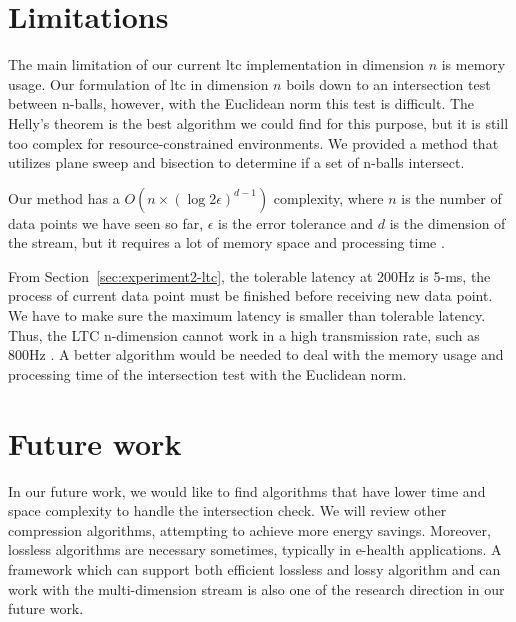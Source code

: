 \section{Limitations}


The main limitation of our current \acrshort{ltc} implementation in
dimension $n$ is memory usage. Our formulation of \acrshort{ltc} in
dimension $n$ boils down to an intersection test between n-balls, however,
with the Euclidean norm this test is difficult. The Helly's theorem is the
best algorithm we could find for this purpose, but it is still too complex
for resource-constrained environments.  We provided a method that utilizes
plane sweep and bisection to determine if a set of n-balls intersect.

Our method has a $O(n\times (\log{2\epsilon})^{d-1})$  complexity,
where $n$ is the number of data points we have seen so far, $\epsilon$ is the
error tolerance and $d$ is the dimension of the stream, but it requires a lot of
memory space and processing time . 

From Section~\ref{sec:experiment2-ltc}, the tolerable latency at 200Hz is
5-ms, the process of current data point must be finished before receiving
new data point. We have to make sure the maximum latency is smaller than
tolerable latency. Thus, the LTC n-dimension cannot work in a high transmission rate,
such as 800Hz . A better algorithm would be needed to deal
with the memory usage and processing time of the intersection test with the
Euclidean norm.


\section{Future work}

In our future work, we would like to find algorithms that have lower time and
space complexity to handle the intersection check. We will review other
compression algorithms, attempting to achieve more energy savings. Moreover, 
lossless algorithms are necessary sometimes, typically in e-health applications. 
A framework which can support both efficient lossless and lossy algorithm and
can work with the multi-dimension stream is also one of the research
direction in our future work.
